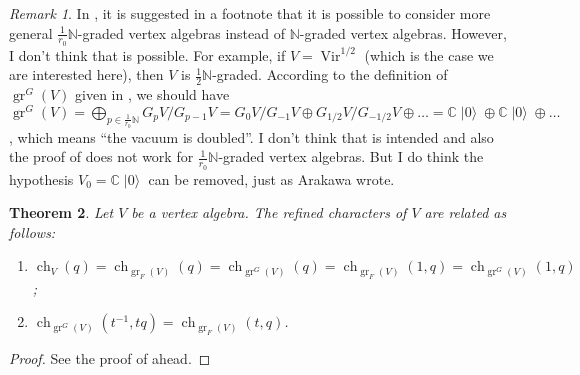 \documentclass[a4paper, 12pt, reqno]{amsart}
\newtheorem{theorem}{Theorem}[subsection]
\theoremstyle{remark}
\newtheorem{remark}[theorem]{Remark}
\numberwithin{equation}{subsection}
\DeclareMathOperator{\Vir}{Vir}
\DeclareMathOperator{\gr}{gr}
\DeclareMathOperator{\ch}{ch}
\DeclareMathOperator{\vac}{|0\rangle}
\begin{document}
\begin{remark}
  \label{rmk:27}
  In \cite{arakawa_remark_2012}, it is suggested in a footnote that it is possible to consider more general $\tfrac{1}{r_0}\mathbb{N}$-graded vertex algebras instead of $\mathbb{N}$-graded vertex algebras.
  However, I don't think that is possible.
  For example, if $V = \Vir^{1/2}$ (which is the case we are interested here), then $V$ is $\tfrac{1}{2}\mathbb{N}$-graded.
  According to the definition of $\gr^G(V)$ given in \cite{arakawa_remark_2012}, we should have $\gr^G(V) = \bigoplus_{p \in \tfrac{1}{r_0}\mathbb{N}}G_pV/G_{p - 1}V = G_0V/G_{-1}V \oplus G_{1/2}V/G_{-1/2}V \oplus \dots = \mathbb{C}\vac \oplus \mathbb{C}\vac \oplus \dots$, which means ``the vacuum is doubled''.
  I don't think that is intended and also the proof of \cite[Proposition 2.6.1]{arakawa_remark_2012} does not work for $\tfrac{1}{r_0}\mathbb{N}$-graded vertex algebras.
  But I do think the hypothesis $V_0 = \mathbb{C}\vac$ can be removed, just as Arakawa wrote.
\end{remark}

\begin{theorem}
  \label{thr:34}
  Let $V$ be a vertex algebra.
  The refined characters of $V$ are related as follows:
  \begin{enumerate}
  \item $\ch_V(q) = \ch_{\gr_F(V)}(q) = \ch_{\gr^G(V)}(q) = \ch_{\gr_F(V)}(1, q) = \ch_{\gr^G(V)}(1, q)$;
  \item $\ch_{\gr^G(V)}(t^{-1}, tq) = \ch_{\gr_F(V)}(t, q)$.
  \end{enumerate}
\end{theorem}

\begin{proof}
  See the proof of  ahead.
\end{proof}
\end{document}

